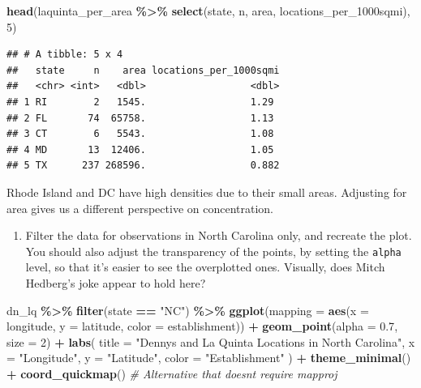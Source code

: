 \documentclass[
]{article}
\newenvironment{Shaded}{\begin{snugshade}}{\end{snugshade}}
\newcommand{\AttributeTok}[1]{\textcolor[rgb]{0.13,0.29,0.53}{#1}}
\newcommand{\CommentTok}[1]{\textcolor[rgb]{0.56,0.35,0.01}{\textit{#1}}}
\newcommand{\DecValTok}[1]{\textcolor[rgb]{0.00,0.00,0.81}{#1}}
\newcommand{\FloatTok}[1]{\textcolor[rgb]{0.00,0.00,0.81}{#1}}
\newcommand{\FunctionTok}[1]{\textcolor[rgb]{0.13,0.29,0.53}{\textbf{#1}}}
\newcommand{\NormalTok}[1]{#1}
\newcommand{\SpecialCharTok}[1]{\textcolor[rgb]{0.81,0.36,0.00}{\textbf{#1}}}
\newcommand{\StringTok}[1]{\textcolor[rgb]{0.31,0.60,0.02}{#1}}
\providecommand{\tightlist}{%
  \setlength{\itemsep}{0pt}\setlength{\parskip}{0pt}}
\begin{document}
\begin{Shaded}
\begin{Highlighting}[]
\FunctionTok{head}\NormalTok{(laquinta\_per\_area }\SpecialCharTok{\%\textgreater{}\%} \FunctionTok{select}\NormalTok{(state, n, area, locations\_per\_1000sqmi), }\DecValTok{5}\NormalTok{)}
\end{Highlighting}
\end{Shaded}

\begin{verbatim}
## # A tibble: 5 x 4
##   state     n    area locations_per_1000sqmi
##   <chr> <int>   <dbl>                  <dbl>
## 1 RI        2   1545.                  1.29 
## 2 FL       74  65758.                  1.13 
## 3 CT        6   5543.                  1.08 
## 4 MD       13  12406.                  1.05 
## 5 TX      237 268596.                  0.882
\end{verbatim}

Rhode Island and DC have high densities due to their small areas.
Adjusting for area gives us a different perspective on concentration.

\begin{enumerate}
\def\labelenumi{\arabic{enumi}.}
\setcounter{enumi}{10}
\tightlist
\item
  Filter the data for observations in North Carolina only, and recreate
  the plot. You should also adjust the transparency of the points, by
  setting the \texttt{alpha} level, so that it's easier to see the
  overplotted ones. Visually, does Mitch Hedberg's joke appear to hold
  here?
\end{enumerate}

\begin{Shaded}
\begin{Highlighting}[]
\NormalTok{dn\_lq }\SpecialCharTok{\%\textgreater{}\%}
  \FunctionTok{filter}\NormalTok{(state }\SpecialCharTok{==} \StringTok{"NC"}\NormalTok{) }\SpecialCharTok{\%\textgreater{}\%}
  \FunctionTok{ggplot}\NormalTok{(}\AttributeTok{mapping =} \FunctionTok{aes}\NormalTok{(}\AttributeTok{x =}\NormalTok{ longitude, }\AttributeTok{y =}\NormalTok{ latitude, }\AttributeTok{color =}\NormalTok{ establishment)) }\SpecialCharTok{+}
  \FunctionTok{geom\_point}\NormalTok{(}\AttributeTok{alpha =} \FloatTok{0.7}\NormalTok{, }\AttributeTok{size =} \DecValTok{2}\NormalTok{) }\SpecialCharTok{+}
  \FunctionTok{labs}\NormalTok{(}
    \AttributeTok{title =} \StringTok{"Denny\textquotesingle{}s and La Quinta Locations in North Carolina"}\NormalTok{,}
    \AttributeTok{x =} \StringTok{"Longitude"}\NormalTok{,}
    \AttributeTok{y =} \StringTok{"Latitude"}\NormalTok{,}
    \AttributeTok{color =} \StringTok{"Establishment"}
\NormalTok{  ) }\SpecialCharTok{+}
  \FunctionTok{theme\_minimal}\NormalTok{() }\SpecialCharTok{+}
  \FunctionTok{coord\_quickmap}\NormalTok{()  }\CommentTok{\# Alternative that doesn\textquotesingle{}t require mapproj}
\end{Highlighting}
\end{Shaded}
\end{document}
